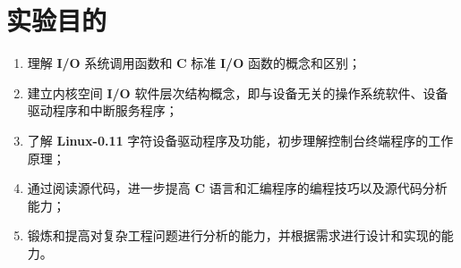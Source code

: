 \section{实验目的}
    \begin{enumerate}
        \item 理解 \textbf{I/O} 系统调用函数和 \textbf{C} 标准 \textbf{I/O} 函数的概念和区别；
        \item 建立内核空间 \textbf{I/O} 软件层次结构概念，即与设备无关的操作系统软件、设备驱动程序和中断服务程序；
        \item 了解 \textbf{Linux-0.11} 字符设备驱动程序及功能，初步理解控制台终端程序的工作原理；
        \item 通过阅读源代码，进一步提高 \textbf{C} 语言和汇编程序的编程技巧以及源代码分析能力；
        \item 锻炼和提高对复杂工程问题进行分析的能力，并根据需求进行设计和实现的能力。
    \end{enumerate}